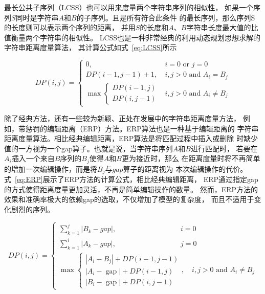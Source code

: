 最长公共子序列（LCSS）也可以用来度量两个字符串序列的相似性，
如果一个序列$S$同时是字符串$A$和$B$的子序列。且是所有符合此条件
的最长序列，那么序列S的长度则可以表示两个序列的距离，
并用$S$的长度和$A$、$B$字符串长度最大值的比值衡量两个字符串的相似性。
LCSS也是一种非常经典的利用动态规划思想求解的字符串距离度量算法，
其计算公式如式~\ref{eq:LCSS}所示

\begin{equation}
  D P(i, j)= \begin{cases}0, & i=0 \text { or } j=0 \\ D P(i-1, j-1)+1, & i, j>0 \text { and } A_{i}=B_{j} \\ \max \begin{cases}D P(i-1, j) \\ D P(i, j-1)\end{cases} & i, j>0 \text { and } A_{i} \neq B_{j}\end{cases}
  \label{eq:LCSS}
\end{equation}

除了经典方法，还有一些较为新颖、正处在发展中的字符串距离度量方法，
例如，带惩罚的编辑距离（ERP）方法。ERP算法也是一种基于编辑距离的
字符串距离度量算法。相比经典编辑距离，ERP算法是将匹配过程中插入或删除
时缺少值的一方视为一个gap算子。也就是说，当字符串序列$A$和$B$进行匹配时，
若要在$A_i$插入一个来自$B$序列的$B_j$使得$A$和$B$更为接近时，那么
在距离度量时将不再简单的增加一次编辑操作，而是将$B_j$与$gap$算子的距离视为
本次编辑操作的代价。式~\ref{eq:ERP}展示了ERP方法的计算公式，相比经典编辑距离，
ERP通过指定gap的方式使得距离度量更加灵活，不再是简单编辑操作的数量。
然而，ERP方法的效果和准确率极大的依赖gap的选取，不仅增加了模型的复杂度，
而且不适用于变化剧烈的序列。

\begin{equation}
  D P(i, j)= \begin{cases}\sum_{k=1}^{j}\left|B_{k}-g a p\right|, \qquad \qquad \qquad \qquad \quad i=0 \\
    \sum_{k=1}^{i}\left|A_{k}-g a p\right|,\qquad \qquad \qquad \qquad \quad j=0 \\
    \max \left\{\begin{array}{l}
    \left|A_{i}-B_{j}\right|+D P(i-1, j-1) \\
    \left|A_{i}-\operatorname{gap}\right|+D P(i-1, j) \\
    \left|B_{i}-\operatorname{gap}\right|+D P(i, j-1)
    \end{array}, \quad i, j>0 \text { and } A_{i} \neq B_{j}\right.\end{cases}
    \label{eq:ERP}
\end{equation}

